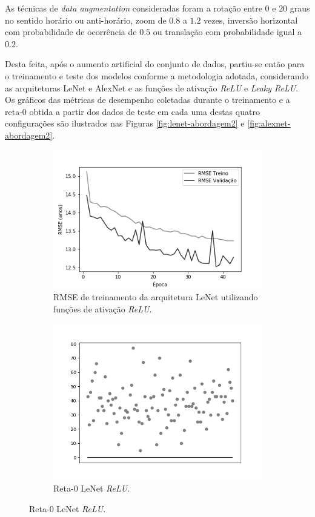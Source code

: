 	As técnicas de \emph{data augmentation} consideradas foram a rotação entre $0$ e $20$ graus no sentido horário ou anti-horário, zoom de $0.8$ a $1.2$ vezes, inversão horizontal com probabilidade de ocorrência de $0.5$ ou translação com probabilidade igual a $0.2$.

	Desta feita, após o aumento artificial do conjunto de dados, partiu-se então para o treinamento e teste dos modelos conforme a metodologia adotada, considerando as arquiteturas LeNet e AlexNet e as funções de ativação \emph{ReLU} e \emph{Leaky ReLU}. Os gráficos das métricas de desempenho coletadas durante o treinamento e a reta-0 obtida a partir dos dados de teste em cada uma destas quatro configurações são ilustrados nas Figuras \ref{fig:lenet-abordagem2} e \ref{fig:alexnet-abordagem2}.

	\begin{figure}[hb!]
		\caption{Resultados do treinamento e teste da CNN LeNet de acordo com a Abordagem 2.}\label{fig:lenet-abordagem2}
		\begin{subfigure}[hb]{0.5\linewidth}
			\caption{RMSE de treinamento da arquitetura LeNet utilizando funções de ativação \emph{ReLU}.}
			\includegraphics[width=\linewidth]{img/graficos/history/lenet/fig-history-image-treat-2-lenet-relu-rmse.png}%
		\end{subfigure}%
		\begin{subfigure}[hb]{0.5\linewidth}
			\caption{Reta-0 LeNet \emph{ReLU}.}
			\includegraphics[width=\linewidth]{img/graficos/reta0/lenet/fig-reta-0-image-treat-2-lenet-relu.png}%

\end{subfigure}
\end{figure}
